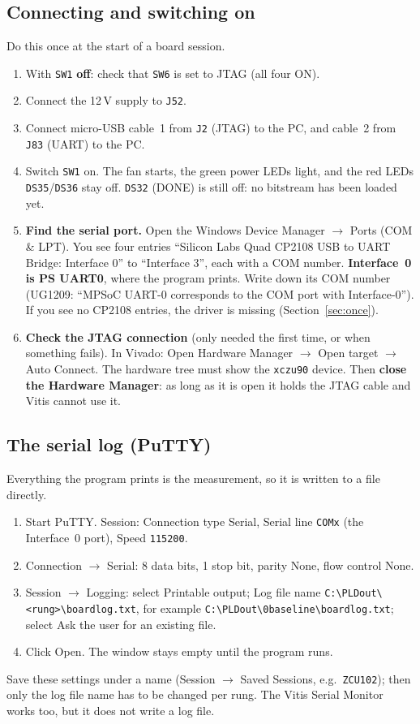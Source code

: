 \documentclass[11pt,a4paper]{article}
\newcommand{\code}[1]{\texttt{#1}}
\newcommand{\bs}{\textbackslash\allowbreak{}}
\renewcommand{\_}{\oldunderscore\allowbreak{}}
\newcommand{\out}[1]{\code{C:\bs PLD\_out\bs #1}}
\newcommand{\menu}[1]{\textsf{#1}}
\begin{document}
\subsection{Connecting and switching on}\label{sec:connect}
Do this once at the start of a board session.
\begin{enumerate}
  \item With \code{SW1} \textbf{off}: check that \code{SW6} is set to JTAG (all four ON).
  \item Connect the 12\,V supply to \code{J52}.
  \item Connect micro-USB cable~1 from \code{J2} (JTAG) to the PC, and cable~2 from \code{J83} (UART) to the PC.
  \item Switch \code{SW1} on. The fan starts, the green power LEDs light, and the red LEDs \code{DS35}/\code{DS36} stay off. \code{DS32} (DONE) is still off: no bitstream has been loaded yet.
  \item \textbf{Find the serial port.} Open the Windows \menu{Device Manager} $\rightarrow$ \menu{Ports (COM \& LPT)}. You see four entries ``Silicon Labs Quad CP2108 USB to UART Bridge: Interface 0'' to ``Interface 3'', each with a COM number. \textbf{Interface~0 is PS UART0}, where the program prints. Write down its COM number (UG1209: ``MPSoC UART-0 corresponds to the COM port with Interface-0''). If you see no CP2108 entries, the driver is missing (Section~\ref{sec:once}).
  \item \textbf{Check the JTAG connection} (only needed the first time, or when something fails). In Vivado: \menu{Open Hardware Manager} $\rightarrow$ \menu{Open target} $\rightarrow$ \menu{Auto Connect}. The hardware tree must show the \code{xczu9\_0} device. Then \textbf{close the Hardware Manager}: as long as it is open it holds the JTAG cable and Vitis cannot use it.
\end{enumerate}

\subsection{The serial log (PuTTY)}\label{sec:putty}
Everything the program prints is the measurement, so it is written to a file directly.
\begin{enumerate}
  \item Start PuTTY. \menu{Session}: Connection type \menu{Serial}, Serial line \code{COMx} (the Interface~0 port), Speed \code{115200}.
  \item \menu{Connection $\rightarrow$ Serial}: 8 data bits, 1 stop bit, parity \menu{None}, flow control \menu{None}.
  \item \menu{Session $\rightarrow$ Logging}: select \menu{Printable output}; Log file name \out{<rung>\bs board\_log.txt}, for example \out{0\_baseline\bs board\_log.txt}; select \menu{Ask the user} for an existing file.
  \item Click \menu{Open}. The window stays empty until the program runs.
\end{enumerate}
Save these settings under a name (\menu{Session $\rightarrow$ Saved Sessions}, e.g.\ \code{ZCU102}); then only the log file name has to be changed per rung. The Vitis \menu{Serial Monitor} works too, but it does not write a log file.
\end{document}

